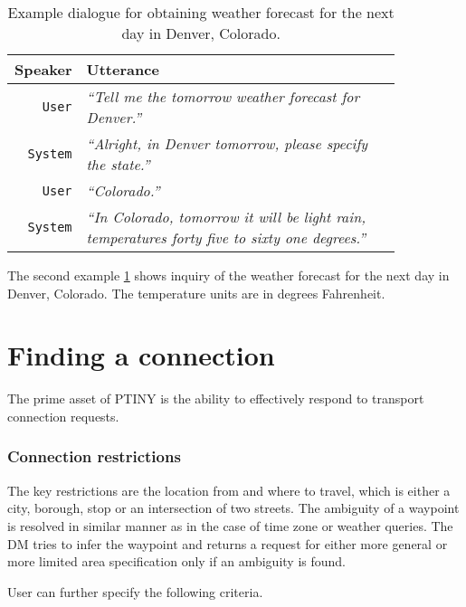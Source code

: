 \begin{table}[h]
\centering
\begin{tabular}{ | r | p{0.85\linewidth} | } \hline
	\textbf{Speaker} & \textbf{Utterance} \\ \hline
	\texttt{User} & \textit{``Tell me the tomorrow weather forecast for Denver.''} \\ \hline
	\texttt{System} & \textit{``Alright, in Denver tomorrow, please specify the state.''} \\ \hline
	\texttt{User} & \textit{``Colorado.''} \\ \hline
	\texttt{System} & \textit{``In Colorado, tomorrow it will be light rain, temperatures forty five to sixty one degrees.''} \\ \hline
\end{tabular}
\caption[Weather forecast for the next day in Denver, Colorado]{Example dialogue for obtaining weather forecast for the next day in Denver, Colorado.}
\label{table:forecast}
\end{table}

The second example \ref{table:forecast} shows inquiry of the weather forecast for the next day in Denver, Colorado.
The temperature units are in degrees Fahrenheit.

\section{Finding a connection}

The prime asset of PTINY is the ability to effectively respond to transport connection requests.

\subsubsection{Connection restrictions}

The key restrictions are the location from and where to travel, which is either a city, borough, stop or an intersection of two streets.
The ambiguity of a waypoint is resolved in similar manner as in the case of time zone or weather queries.
The DM tries to infer the waypoint and returns a request for either more general or more limited area specification only if an ambiguity is found.

User can further specify the following criteria.

